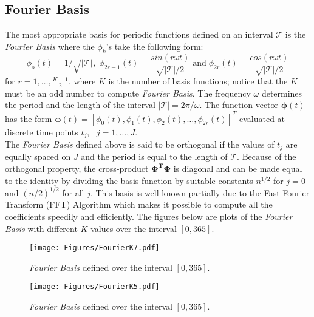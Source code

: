 \subsection{Fourier Basis}
The most appropriate basis for periodic functions defined on an interval $\mathcal{T}$ is the \textit{Fourier Basis} where the $\phi_{k}$'s take the following form:
\begin{equation}\label{fouriereq}
   \phi_{o}(t) = 1/\sqrt{|\mathcal{T}|},\; \phi_{2r-1}(t) = \dfrac{sin(r\omega t)}{\sqrt{|\mathcal{T}|/2}} \; \text{and} \; \phi_{2r}(t) = \dfrac{cos(r\omega t)}{\sqrt{|\mathcal{T}|/2}}
\end{equation}
for $r=1,\dots,\frac{K-1}{2}$, where $K$ is the number of basis functions; notice that the $K$ must be an odd number to compute \textit{Fourier Basis}. The frequency $\omega$ determines the period and the length of the interval $|\mathcal{T}|=2\pi/\omega$. The function vector $\bm{\phi}(t)$ has the form $\bm{\phi}(t) = \left[\phi_{0}(t),\phi_{1}(t),\phi_{2}(t),\dots,\phi_{2r}(t)\right]^T$ evaluated at discrete time points $t_{j}, \text{ }j=1,\dots,J$.\\
The \textit{Fourier Basis} defined above is said to be orthogonal if the values of $t_{j}$ are equally spaced on $J$ and the period is equal to the length of $\mathcal{T}$. Because of the orthogonal property, the cross-product $\mathbf{\Phi^{T}\Phi}$ is diagonal and can be made equal to the identity by dividing the basis function by suitable constants $n^{1/2}$ for $j=0$ and $(n/2)^{1/2}$ for all $j$. This basis is well known partially due to the Fast Fourier Transform (FFT) Algorithm which makes it possible to compute all the coefficients speedily and efficiently. The figures below are plots of the \textit{Fourier Basis} with different $K$-values over the interval $\left[0,365\right]$.

\begin{figure}[h]
  \centering
    \texttt{[image: Figures/FourierK7.pdf]}
  \caption[\textit{Fourier Basis} with \textit{K}=7.]{\textit{Fourier Basis} defined over the interval $\left[0,365\right]$.}
  \label{fig:FDA2}
\end{figure}

\begin{figure}[h]
  \centering
    \texttt{[image: Figures/FourierK5.pdf]}
  \caption[\textit{Fourier Basis} with \textit{K}=5.]{\textit{Fourier Basis} defined over the interval $\left[0,365\right]$.}
  \label{fig:FDA11}
\end{figure}

